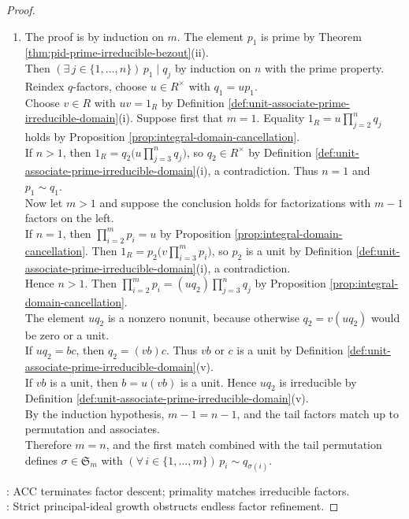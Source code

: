 \begin{theorem}
\begin{proof}
\begin{enumerate}[label=(\roman*)]
\item The proof is by induction on $m$. The element $p_1$ is prime by Theorem \ref{thm:pid-prime-irreducible-bezout}(ii).\\
Then $(\exists\,j\in\{1,\ldots,n\})\,p_1\mid q_j$ by induction on $n$ with the prime property. Reindex $q$-factors, choose $u\in R^\times$ with $q_1=up_1$.\\
Choose $v\in R$ with $uv=1_R$ by Definition \ref{def:unit-associate-prime-irreducible-domain}(i). Suppose first that $m=1$. Equality $1_R=u\prod\limits_{j=2}^{n}q_j$ holds by Proposition \ref{prop:integral-domain-cancellation}.\\
If $n>1$, then $1_R=q_2\bigl(u\prod\limits_{j=3}^{n}q_j\bigr)$, so $q_2\in R^\times$ by Definition \ref{def:unit-associate-prime-irreducible-domain}(i), a contradiction. Thus $n=1$ and $p_1\sim q_1$.\\
Now let $m>1$ and suppose the conclusion holds for factorizations with $m-1$ factors on the left.\\
If $n=1$, then $\prod\limits_{i=2}^{m}p_i=u$ by Proposition \ref{prop:integral-domain-cancellation}. Then $1_R=p_2\bigl(v\prod\limits_{i=3}^{m}p_i\bigr)$, so $p_2$ is a unit by Definition \ref{def:unit-associate-prime-irreducible-domain}(i), a contradiction.\\
Hence $n>1$. Then $\prod\limits_{i=2}^{m}p_i=(uq_2)\prod\limits_{j=3}^{n}q_j$ by Proposition \ref{prop:integral-domain-cancellation}.\\
The element $uq_2$ is a nonzero nonunit, because otherwise $q_2=v(uq_2)$ would be zero or a unit.\\
If $uq_2=bc$, then $q_2=(vb)c$. Thus $vb$ or $c$ is a unit by Definition \ref{def:unit-associate-prime-irreducible-domain}(v).\\
If $vb$ is a unit, then $b=u(vb)$ is a unit. Hence $uq_2$ is irreducible by Definition \ref{def:unit-associate-prime-irreducible-domain}(v).\\
By the induction hypothesis, $m-1=n-1$, and the tail factors match up to permutation and associates.\\
Therefore $m=n$, and the first match combined with the tail permutation defines $\sigma\in\mathfrak{S}_m$ with $(\forall\,i\in\{1,\ldots,m\})\,p_i\sim q_{\sigma(i)}$.
\end{enumerate}
: ACC terminates factor descent; primality matches irreducible factors.\\
: Strict principal-ideal growth obstructs endless factor refinement.
\end{proof}
\end{theorem}
